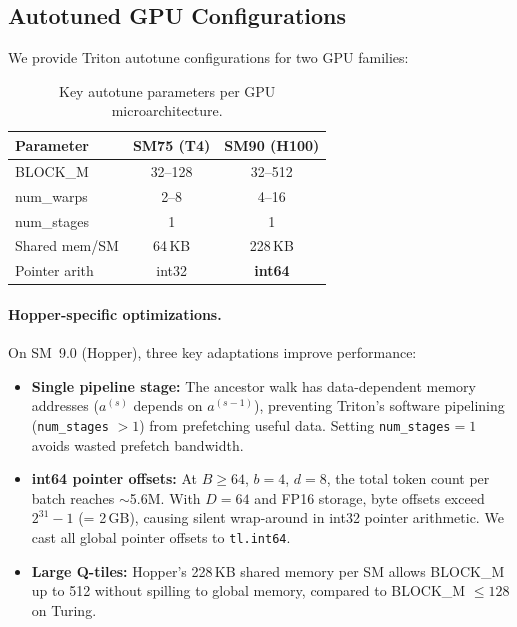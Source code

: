 \documentclass{article}
\newcommand{\depth}{d}
\newcommand{\branching}{b}
\newcommand{\headdim}{D}
\newcommand{\batchsize}{B}
\begin{document}
\subsection{Autotuned GPU Configurations}

We provide Triton autotune configurations for two GPU families:

\begin{table}[h]
\centering
\caption{Key autotune parameters per GPU microarchitecture.}
\label{tab:autotune}
\small
\begin{tabular}{lcc}
\toprule
\textbf{Parameter} & \textbf{SM75 (T4)} & \textbf{SM90 (H100)} \\
\midrule
BLOCK\_M          & 32--128       & 32--512           \\
num\_warps        & 2--8          & 4--16             \\
num\_stages       & 1             & 1                 \\
Shared mem/SM     & 64\,KB        & 228\,KB           \\
Pointer arith     & int32         & \textbf{int64}    \\
\bottomrule
\end{tabular}
\end{table}

\paragraph{Hopper-specific optimizations.}
On SM~9.0 (Hopper), three key adaptations improve performance:

\begin{itemize}[leftmargin=*,itemsep=2pt]
  \item \textbf{Single pipeline stage:}
    The ancestor walk has data-dependent memory addresses
    ($a^{(s)}$ depends on $a^{(s-1)}$), preventing Triton's
    software pipelining (\texttt{num\_stages} $> 1$) from
    prefetching useful data.  Setting \texttt{num\_stages}$= 1$
    avoids wasted prefetch bandwidth.

  \item \textbf{int64 pointer offsets:}
    At $\batchsize \geq 64$, $\branching = 4$, $\depth = 8$, the
    total token count per batch reaches $\sim$5.6M.
    With $\headdim = 64$ and FP16 storage, byte offsets exceed
    $2^{31} - 1$ (= 2\,GB), causing silent wrap-around in int32
    pointer arithmetic.
    We cast all global pointer offsets to \texttt{tl.int64}.

  \item \textbf{Large Q-tiles:}
    Hopper's 228\,KB shared memory per SM allows BLOCK\_M
    up to 512 without spilling to global memory, compared to
    BLOCK\_M $\leq 128$ on Turing.
\end{itemize}
\end{document}
